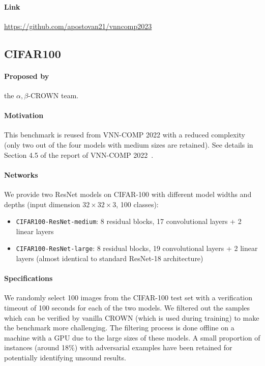 \documentclass[oneside,11pt,dvipsnames]{book}
\begin{document}
\paragraph*{Link} \url{https://github.com/apostovan21/vnncomp2023}



\subsection{CIFAR100}

\paragraph*{Proposed by} the $\alpha,\!\beta$-CROWN team.
\paragraph*{Motivation} This benchmark is reused from VNN-COMP 2022 with a reduced complexity (only two out of the four models with medium sizes are retained). 
See details in Section 4.5 of the report of VNN-COMP 2022~\cite{muller2022vnncomp}.

\paragraph*{Networks} We provide two ResNet models on CIFAR-100 with different model widths and depths (input dimension $32 \times 32 \times 3$, 100 classes):
\begin{itemize}
    \item \texttt{CIFAR100-ResNet-medium}: 8 residual blocks, 17 convolutional layers + 2 linear layers
    \item \texttt{CIFAR100-ResNet-large}: 8 residual blocks, 19 convolutional layers + 2 linear layers (almost identical to standard ResNet-18 architecture)
\end{itemize}

\paragraph*{Specifications} 
We randomly select 100 images from the CIFAR-100 test set with a verification timeout of 100 seconds for each of the two models. 
We filtered out the samples which can be verified by vanilla CROWN (which is used during training) to make the benchmark more challenging. The filtering process is done offline on a machine with a GPU due to the large sizes of these models. 
A small proportion of instances (around 18\%) with adversarial examples have been retained for potentially identifying unsound results. 
\end{document}
